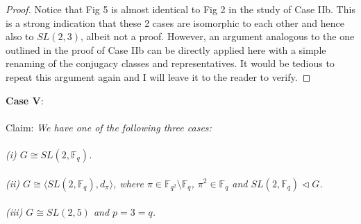 \begin{proof}






Notice that Fig 5 is almost identical to Fig 2 in the study of Case IIb. This is a strong indication that these 2 cases are isomorphic to each other and hence also to $SL(2,3)$, albeit not a proof. However, an argument analogous to the one outlined in the proof of Case IIb can be directly applied here with a simple renaming of the conjugacy classes and representatives. It would be tedious to repeat this argument again and I will leave it to the reader to verify.

\end{proof}

\textbf{Case V}:\\
\\
Claim: \textit{We have one of the following three cases: \\
\\
(i) $G \cong SL(2,\mathbb{F}_q)$. \\
\\
(ii) $G \cong \langle SL(2,\mathbb{F}_q), d_\pi \rangle$, where $\pi \in \mathbb{F}_{q^2} \setminus \mathbb{F}_q$, $\pi^2 \in \mathbb{F}_q$ and $SL(2,\mathbb{F}_q) \vartriangleleft G$. \\
\\
(iii) $G \cong SL(2,5)$ and $p=3=q$.}

